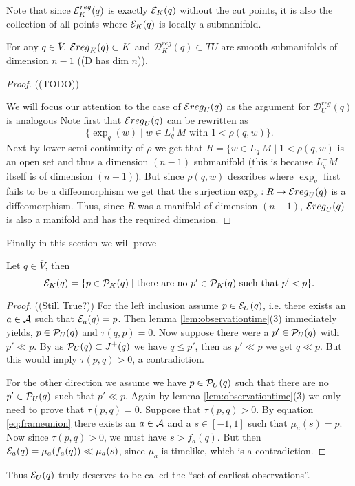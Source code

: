Note that since $\mc{E}^{reg}_K(q)$ is exactly $\mc{E}_K(q)$ without the cut points, it is also the collection of all points where $\mc{E}_K(q)$ is locally a submanifold.

\begin{proposition} For any $q\in \overline{V}$, $\mc{E}{reg}_K(q)\subset K$ and $\mathcal{D}^{reg}_K(q)\subset TU$ are smooth submanifolds of dimension $n-1$ ((D has dim $n$)).
\end{proposition}
\begin{proof}
((TODO))


We will focus our attention to the case of $\mc{E}{reg}_U(q)$ as the argument for  $\mathcal{D}^{reg}_U(q)$ is analogous
Note first that $\mc{E}{reg}_U(q)$ can be rewritten as 
\[
    \{\exp_q(w) \mid  w\in L^+_qM \text{ with } 1<\rho(q,w)\}.
\]
Next by lower semi-continuity of $\rho$ we get that $R=\{w\in L^+_qM \mid 1<\rho(q,w)$ is an open set and thus a dimension $(n-1)$ submanifold (this is because $L^+_qM$ itself is of dimension $(n-1)$). But since $\rho(q,w)$ describes where $\exp_q$ first fails to be a diffeomorphism we get that the surjection $\exp_p:R\to \mc{E}{reg}_U(q)$ is a diffeomorphism. Thus, since $R$ was a manifold of dimension $(n-1)$, $\mc{E}{reg}_U(q)$ is also a manifold and has the required dimension.
\end{proof}

Finally in this section we will prove
\begin{proposition}\label{prop:seocharact}
Let $q\in \overline{V}$, then 
\begin{equation*}
    \mc{E}_K(q) = \{ p \in \P_K(q) \mid \text{there are no $p'\in \P_K(q)$ such that $p' < p$} \}.
\end{equation*}
\end{proposition}
\begin{proof}
((Still True?))
For the left inclusion assume $p\in \mc{E}_U(q)$, i.e. there exists an $a\in \ca$ such that $\mc{E}_a(q)=p$. Then lemma \ref{lem:observationtime}(3) immediately yields, $p\in \P_U(q)$ and  $\tau(q,p)=0$. Now suppose there were a $p'\in \P_U(q)$ with $p'\ll p$. By as $\P_U(q)\subset J^+(q)$ we have $q\leq p'$, then as $p'\ll p$ we get $q\ll p$. But this would imply $\tau(p,q)>0$, a contradiction.

For the other direction we assume we have $p \in \P_U(q)$ such that there are no $p'\in\P_U(q)$ such that $p'\ll p$. Again by lemma \ref{lem:observationtime}(3) we only need to prove that $\tau(p,q)=0$. Suppose that $\tau(p,q)>0$. By equation \ref{eq:frameunion} there exists an $a\in \ca$ and a $s\in [-1,1]$ such that $\mu_a(s) = p$. Now since $\tau(p,q)>0$, we must have $s > f_a(q)$. But then $\mc{E}_a(q) = \mu_a(f_a(q)) \ll  \mu_a(s)$, since $\mu_a$ is timelike, which is a contradiction.
\end{proof}
Thus $\mc{E}_U(q)$ truly deserves to be called the \enquote{set of earliest observations}.

